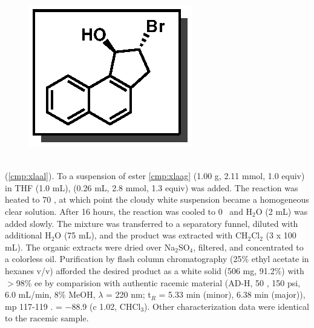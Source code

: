 \vspace{10pt}
\begin{figure}
  \vspace{-30pt}
  \begin{center}
    \includegraphics[scale=0.8]{chp_asymmetric/images/xlaaf}
  \end{center}
  \vspace{-35pt}
\end{figure}
\noindent \textbf{\CMPxlaal} \\(\ref{cmp:xlaal}). To a suspension of ester
\ref{cmp:xlaag} (1.00 g, 2.11 mmol, 1.0 equiv) in THF (1.0 mL),
 (0.26 mL, 2.8 mmol, 1.3 equiv) was added. The reaction was
heated to 70 \degc, at which point the cloudy white suspension became a 
homogeneous clear solution. After 16 hours, the reaction was cooled to 0 \degc\ 
and H$_2$O (2 mL) was added slowly. The mixture was transferred to a separatory
funnel, diluted with additional H$_2$O (75 mL), and the product was extracted
with CH$_2$Cl$_2$ (3 x 100 mL). The organic extracts were dried over
Na$_2$SO$_4$, filtered, and concentrated to a colorless oil. Purification by
flash column chromatography (25\% ethyl acetate in hexanes v/v) afforded the
desired product as a white solid (506 mg, 91.2\%) with $>$98\% ee by comparision with
authentic racemic material (AD-H, 50 \degc, 150 psi, 6.0 mL/min, 8\% MeOH,
$\lambda$ = 220 nm; t$_R$ = 5.33 min (minor), 6.38 min (major)), mp 117-119 \degc. \rotation = $-$88.9 (c 1.02, CHCl$_3$). Other
characterization data were identical to the racemic sample. \\
